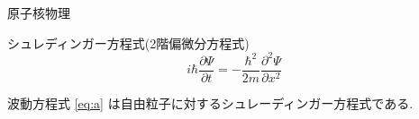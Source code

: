 \documentclass[lualatex,ja=standard,jafont=haranoaji]{bxjsarticle}
\begin{document}
原子核物理

シュレディンガー方程式(2階偏微分方程式)
\begin{equation}
  \label{eq:a}
  i\hbar\frac{\partial\Psi}{\partial t}=-\frac{\hbar^2}{2m}\frac{\partial^2\Psi}{\partial x^2}
\end{equation}

波動方程式 \eqref{eq:a} は自由粒子に対するシュレーディンガー方程式である.
\end{document}
